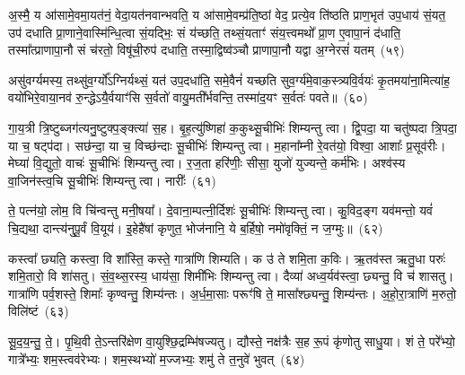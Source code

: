 अ॒स्मै॒ य आ॑सामे॒वमा॒यत॑नं॒ वेदा॒यत॑नवान्भवति॒ य आ॑सामे॒वम्प्र॑ति॒ष्ठां वेद॒ प्रत्ये॒व ति॑ष्ठति प्राण॒भृत॑ उप॒धाय॑ सं॒यत॒ उप॑ दधाति प्रा॒णाने॒वास्मि॑न्धि॒त्वा सं॒यद्भिः॒ सं य॑च्छति॒ तथ्सं॒यताꣳ॑ संय॒त्त्वमथो᳚ प्रा॒ण ए॒वापा॒नं द॑धाति॒ तस्मा᳚त्प्राणापा॒नौ सं च॑रतो॒ विषू॑ची॒रुप॑ दधाति॒ तस्मा॒द्विष्व॑ञ्चौ प्राणापा॒नौ यद्वा अ॒ग्नेरसं॑ यतम्~(५९)

असु॑वर्ग्यमस्य॒ तथ्सु॑व॒र्ग्यो᳚\-ऽग्निर्यथ्सं॒ यत॑ उप॒दधा॑ति॒ समे॒वैनं॑ यच्छति सुव॒र्ग्य॑मे॒वाक॒स्त्र्यवि॒र्वयः॑ कृ॒तमया॑ना॒मित्या॑ह॒ वयो॑भिरे॒वाया॒नव॑ रु॒न्द्धे\-ऽयै॒र्वयाꣳ॑सि स॒र्वतो॑ वायु॒मती᳚र्भवन्ति॒ तस्मा॑द॒यꣳ स॒र्वतः॑ पवते॥~(६०)

{\anuvakamend[{प॒श्चादे॒ताः पु॒रो᳚\-ऽक्ष्ण॒या कल्प॒ते\-ऽसं॑ यतं॒ पञ्च॑त्रिꣳशच्च}]}%

गा॒य॒त्री त्रि॒ष्टुब्जग॑त्यनु॒ष्टुक्प॒ङ्क्त्या॑ स॒ह। बृ॒ह॒त्यु॑ष्णिहा॑ क॒कुथ्सू॒चीभिः॑ शिम्यन्तु त्वा। द्वि॒पदा॒ या चतु॑ष्पदा त्रि॒पदा॒ या च॒ षट्प॑दा। सछ॑न्दा॒ या च॒ विच्छ॑न्दाः सू॒चीभिः॑ शिम्यन्तु त्वा। म॒हाना᳚म्नी रे॒वत॑यो॒ विश्वा॒ आशाः᳚ प्र॒सूव॑रीः। मेघ्या॑ वि॒द्युतो॒ वाचः॑ सू॒चीभिः॑ शिम्यन्तु त्वा। र॒ज॒ता हरि॑णीः॒ सीसा॒ युजो॑ युज्यन्ते॒ कर्म॑भिः। अश्व॑स्य वा॒जिन॑स्त्व॒चि सू॒चीभिः॑ शिम्यन्तु त्वा। नारीः᳚~(६१)

ते॒ पत्न॑यो॒ लोम॒ वि चि॑न्वन्तु मनी॒षया᳚। दे॒वाना॒म्पत्नी॒र्दिशः॑ सू॒चीभिः॑ शिम्यन्तु त्वा। कु॒विद॒ङ्ग यव॑मन्तो॒ यवं॑ चि॒द्यथा॒ दान्त्य॑नुपू॒र्वं वि॒यूय॑। इ॒हेहै॑षां कृणुत॒ भोज॑नानि॒ ये ब॒र्\mbox{}हिषो॒ नमो॑वृक्तिं॒ न ज॒ग्मुः॥~(६२)

{\anuvakamend[{नारी᳚स्त्रि॒ꣳ॒शच्च॑}]}%

कस्त्वा᳚ छ्यति॒ कस्त्वा॒ वि शा᳚स्ति॒ कस्ते॒ गात्रा॑णि शिम्यति। क उ॑ ते शमि॒ता क॒विः। ऋ॒तव॑स्त ऋतु॒धा परुः॑ शमि॒तारो॒ वि शा॑सतु। सं॒व॒थ्स॒रस्य॒ धाय॑सा॒ शिमी॑भिः शिम्यन्तु त्वा। दैव्या॑ अध्व॒र्यव॑स्त्वा॒ छ्यन्तु॒ वि च॑ शासतु। गात्रा॑णि पर्व॒शस्ते॒ शिमाः᳚ कृण्वन्तु॒ शिम्य॑न्तः। अ॒र्ध॒मा॒साः परूꣳ॑षि ते॒ मासा᳚श्छ्यन्तु॒ शिम्य॑न्तः। अ॒हो॒रा॒त्राणि॑ म॒रुतो॒ विलि॑ष्टं~(६३)

सू॒द॒य॒न्तु॒ ते॒। पृ॒थि॒वी ते॒\-ऽन्तरि॑क्षेण वा॒युश्छि॒द्रम्भि॑षज्यतु। द्यौस्ते॒ नक्ष॑त्रैः स॒ह रू॒पं कृ॑णोतु साधु॒या। शं ते॒ परे᳚भ्यो॒ गात्रे᳚भ्यः॒ शम॒स्त्वव॑रेभ्यः। शम॒स्थभ्यो॑ म॒ज्जभ्यः॒ शमु॑ ते त॒नुवे॑ भुवत्~(६४)


{\anuvakamend[{विलि॑ष्टन्त्रि॒ꣳ॒शच्च॑}]}%

{\anuvakamend[{उ॒थ्स॒न्न॒य॒ज्ञ इन्द्रा᳚ग्नी दे॒वा वा अ॑क्षणयास्तो॒मीया॑ अ॒ग्नेर्भा॒गो᳚\-ऽस्यग्ने॑ जा॒तान्र॒श्मिरिति॑ नाक॒सद्भि॒श्छन्दाꣳ॑सि॒ सर्वा᳚भ्यो वृष्टि॒सनी᳚र्देवासु॒राः कनी॑याꣳसः प्र॒जाप॑ते॒रक्षि॒ द्वाद॑श}]}%
